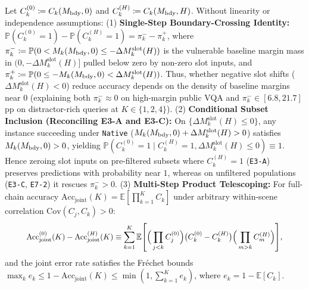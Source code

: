 \begin{proposition}
\label{prop:margin}
\label{subsec:prop1}
Let $C_k^{(0)} \coloneqq C_k(M_{\mathrm{bdy}}, 0)$ and $C_k^{(H)} \coloneqq C_k(M_{\mathrm{bdy}}, H)$. Without linearity or independence assumptions:
(1) \textbf{Single-Step Boundary-Crossing Identity:} $\mathbb{P}(C_k^{(0)} = 1) - \mathbb{P}(C_k^{(H)} = 1) = \pi_k^- - \pi_k^+$, where $\pi_k^- \coloneqq \mathbb{P}(0 < M_k(M_{\mathrm{bdy}}, 0) \le -\Delta M_k^{\mathrm{slot}}(H))$ is the vulnerable baseline margin mass in $(0, -\Delta M_k^{\mathrm{slot}}(H)]$ pulled below zero by non-zero slot inputs, and $\pi_k^+ \coloneqq \mathbb{P}(0 \le -M_k(M_{\mathrm{bdy}}, 0) < \Delta M_k^{\mathrm{slot}}(H))$. Thus, whether negative slot shifts ($\Delta M_k^{\mathrm{slot}}(H) < 0$) reduce accuracy depends on the density of baseline margins near $0$ (explaining both $\pi_k^- \approx 0$ on high-margin public VQA and $\pi_k^- \in [6.8, 21.7]$pp on distractor-rich queries at $K \in \{1, 2, 4\}$).
(2) \textbf{Conditional Subset Inclusion (Reconciling E3-A and E3-C):} On $\{\Delta M_k^{\mathrm{slot}}(H) \le 0\}$, any instance succeeding under \texttt{Native} ($M_k(M_{\mathrm{bdy}}, 0) + \Delta M_k^{\mathrm{slot}}(H) > 0$) satisfies $M_k(M_{\mathrm{bdy}}, 0) > 0$, yielding $\mathbb{P}(C_k^{(0)} = 1 \mid C_k^{(H)} = 1, \Delta M_k^{\mathrm{slot}}(H) \le 0) \equiv 1$. Hence zeroing slot inputs on pre-filtered subsets where $C_k^{(H)}=1$ (\texttt{E3-A}) preserves predictions with probability near $1$, whereas on unfiltered populations (\texttt{E3-C}, \texttt{E7-2}) it rescues $\pi_k^- > 0$.
(3) \textbf{Multi-Step Product Telescoping:} For full-chain accuracy $\mathrm{Acc}_{\mathrm{joint}}(K) = \mathbb{E}[\prod_{k=1}^K C_k]$ under arbitrary within-scene correlation $\mathrm{Cov}(C_j, C_k) > 0$:
\begin{equation}
  \resizebox{0.89\linewidth}{!}{$\displaystyle \mathrm{Acc}_{\mathrm{joint}}^{(0)}(K) - \mathrm{Acc}_{\mathrm{joint}}^{(H)}(K) \equiv \sum_{k=1}^K \mathbb{E}\!\left[ \Big(\prod_{j<k} C_j^{(0)}\Big) \big(C_k^{(0)} - C_k^{(H)}\big) \Big(\prod_{m>k} C_m^{(H)}\Big) \right]\!,$}
  \label{eq:multistep_telescope}
\end{equation}
and the joint error rate satisfies the Fr\'echet bounds $\max_k e_k \le 1 - \mathrm{Acc}_{\mathrm{joint}}(K) \le \min(1, \sum_{k=1}^K e_k)$, where $e_k = 1 - \mathbb{E}[C_k]$.
\end{proposition}

